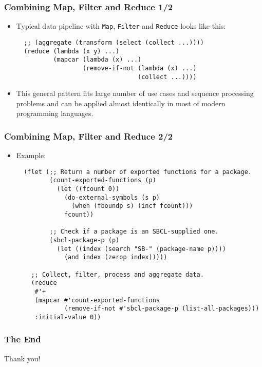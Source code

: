 \documentclass{beamer}
\begin{document}
\begin{frame}[fragile]
  \frametitle{Combining Map, Filter and Reduce 1/2}
  \begin{itemize}
  \item Typical data pipeline with \texttt{Map},
    \texttt{Filter} and \texttt{Reduce} looks like this:
\begin{verbatim}
  ;; (aggregate (transform (select (collect ...))))
  (reduce (lambda (x y) ...)
          (mapcar (lambda (x) ...)
                  (remove-if-not (lambda (x) ...)
                                 (collect ...))))
\end{verbatim}
  \item This general pattern fits large number of use cases and sequence
    processing problems and can be applied almost identically in most of modern
    programming languages.
  \end{itemize}
\end{frame}

\begin{frame}[fragile]
  \frametitle{Combining Map, Filter and Reduce 2/2}
  \begin{itemize}
  \item Example:
\begin{verbatim}
  (flet (;; Return a number of exported functions for a package.
         (count-exported-functions (p)
           (let ((fcount 0))
             (do-external-symbols (s p) 
               (when (fboundp s) (incf fcount)))
             fcount))

         ;; Check if a package is an SBCL-supplied one.
         (sbcl-package-p (p)
           (let ((index (search "SB-" (package-name p))))
             (and index (zerop index)))))

    ;; Collect, filter, process and aggregate data.
    (reduce 
     #'+ 
     (mapcar #'count-exported-functions
             (remove-if-not #'sbcl-package-p (list-all-packages)))
     :initial-value 0))
\end{verbatim}
  \end{itemize}
\end{frame}

\begin{frame}
  \frametitle{The End}
  \begin{center}
    Thank you!
  \end{center}
\end{frame}
\end{document}
